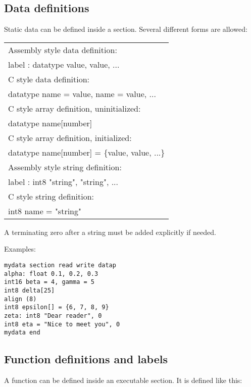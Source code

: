 \documentclass[forwardcom.tex]{subfiles}
\begin{document}
\subsection{Data definitions} \label{assemblyDataDefinitions}
Static data can be defined inside a section. Several different forms are allowed:
\vspace{2mm}

\begin{tabular}{|p{140mm}|}
\hline
Assembly style data definition:\\
\hspace{4mm} label : datatype value, value, ...\\
C style data definition:\\
\hspace{4mm} datatype name = value, name = value, ...\\
C style array definition, uninitialized:\\
\hspace{4mm} datatype name[number]\\
C style array definition, initialized:\\
\hspace{4mm} datatype name[number] = \{value, value, ...\}\\
Assembly style string definition:\\
\hspace{4mm} label : int8 "string", "string", ...\\
C style string definition:\\
\hspace{4mm} int8 name = "string" \\
\hline
\end{tabular}
\vspace{2mm}

A terminating zero after a string must be added explicitly if needed.
\vspace{2mm}

Examples:
\vspace{1mm}

\begin{lstlisting}[frame=single, showstringspaces=false]
mydata section read write datap
alpha: float 0.1, 0.2, 0.3
int16 beta = 4, gamma = 5
int8 delta[25]
align (8)
int8 epsilon[] = {6, 7, 8, 9}
zeta: int8 "Dear reader", 0
int8 eta = "Nice to meet you", 0
mydata end
\end{lstlisting}
\vspace{2mm}


\subsection{Function definitions and labels} \label{assemblyFunctionDef}
A function can be defined inside an executable section. It is defined like this:
\vspace{1mm}
\end{document}
